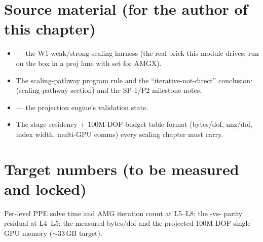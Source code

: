\section*{Source material (for the author of this chapter)}
\begin{itemize}
\item {} --- the W1 weak/strong-scaling
  harness (the real brick this module drives; run on the box in a proj
  lane with  set for AMGX).
\item The scaling-pathway program rule and the ``iterative-not-direct''
  conclusion: 
  (scaling-pathway section) and the SP-1/P2 milestone notes.
\item {} ---
  the projection engine's validation state.
\item The stage-residency + 100M-DOF-budget table format (bytes/dof,
  nnz/dof, index width, multi-GPU comms) every scaling chapter must carry.
\end{itemize}

\section*{Target numbers (to be measured and locked)}
Per-level PPE solve time and AMG iteration count at L5--L8; the
-vs- parity residual at L4--L5; the measured
bytes/dof and the projected 100M-DOF single-GPU memory (${\sim}$33\,GB
target).
